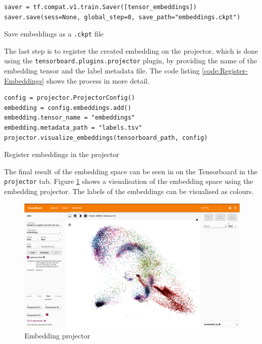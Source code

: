 \begin{code}[H]
\begin{verbatim}
saver = tf.compat.v1.train.Saver([tensor_embeddings])
saver.save(sess=None, global_step=0, save_path="embeddings.ckpt")
\end{verbatim}
\caption{Save embeddings as a \texttt{.ckpt} file}
\label{code:Save-Embeddings-Ckpt}
\end{code}
\noindent
The last step is to register the created embedding on the projector, which is done using the \texttt{tensorboard.plugins.projector} plugin, by providing the name of the embedding tensor and the label metadata file. The code listing \ref{code:Register-Embeddings} shows the process in more detail.

\begin{code}[H]
\begin{verbatim}
config = projector.ProjectorConfig()
embedding = config.embeddings.add()
embedding.tensor_name = "embeddings"
embedding.metadata_path = "labels.tsv"
projector.visualize_embeddings(tensorboard_path, config)
\end{verbatim}
\caption{Register embeddings in the projector}
\label{code:Register-Embeddings}
\end{code}
\noindent
The final result of the embedding space can be seen in on the Tensorboard in the \texttt{projector} tab. Figure \ref{fig:Embedding-Projector} shows a visualisation of the embedding space using the embedding projector. The labels of the embeddings can be visualised as colours.

\begin{figure}[htbp]
	\centering
	\includegraphics[width=0.85\linewidth]{img/Embedding_Projector_Tensorboard.png}
	\caption{Embedding projector}
	\label{fig:Embedding-Projector}
\end{figure}